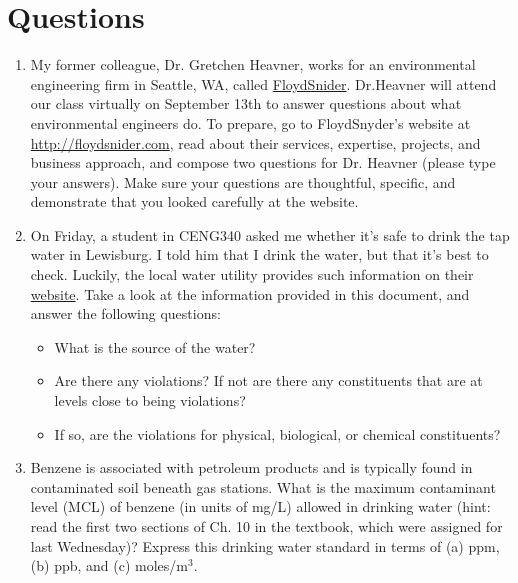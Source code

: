 \documentclass[12pt,letterpaper]{article}
\begin{document}
\section *{Questions}
\begin{enumerate}
\item My former colleague, Dr. Gretchen Heavner, works for an environmental engineering firm in Seattle, WA, called \href{http://floydsnider.com}{Floyd\textbar Snider}.  Dr.Heavner will attend our class virtually on September 13th to answer questions about what environmental engineers do.  To prepare, go to Floyd\textbar Snyder's website at \href{http://floydsnider.com}{http://floydsnider.com}, read about their services, expertise, projects, and business approach, and compose two questions for Dr. Heavner (please type your answers).  Make sure your questions are thoughtful, specific, and  demonstrate that you looked carefully at the website.  

\item On Friday, a student in CENG340 asked me whether it's safe to drink the tap water in Lewisburg. I told him that I drink the water, but that it's best to check.   Luckily, the local water utility provides such information on their \href{http://www.amwater.com/ccr/whitedeer.pdf}{website}.  Take a look at the information provided in this document, and answer the following questions:
\begin{itemize}
\item What is the source of the water?
\item Are there any violations?  If not are there any constituents that are at levels close to being violations?
\item If so, are the violations for physical, biological, or chemical constituents?
\end{itemize}


\item Benzene is associated with petroleum products and is typically found in contaminated soil beneath gas stations.  What is the maximum contaminant level (MCL) of benzene (in units of mg/L) allowed in drinking water (hint: read the first two sections of Ch. 10 in the textbook, which were assigned for last Wednesday)?  Express this drinking water standard in terms of (a) ppm, (b) ppb, and (c) moles/m$^3$.



\end{enumerate}
\end{document}
